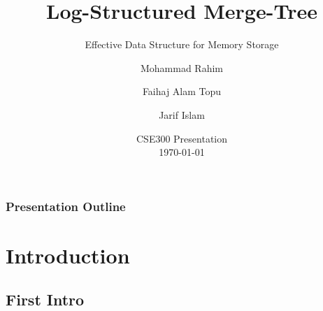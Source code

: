 \documentclass[
	11pt, 
]{beamer}
\title[LSMT]{Log-Structured Merge-Tree} %
\subtitle{Effective Data Structure for Memory Storage} %
\author[MR \and FAT \and JI]{Mohammad Rahim \and Faihaj Alam Topu \and Jarif Islam} %
\institute[BUET]
{
    Department of CSE\\
    Bangladesh University of Engineering \& Technology
}
\date[\today]{CSE300 Presentation \\ \today} %
\begin{document}

\begin{frame}
	\titlepage %
\end{frame}



\begin{frame}
	\frametitle{Presentation Outline} %
	\begin{multicols}{2}
	   \tableofcontents %
        \end{multicols}
\end{frame}


\section{Introduction}

\subsection{First Intro}
\end{document}
